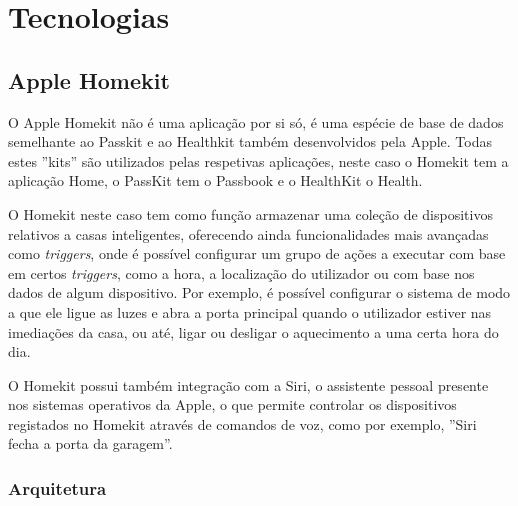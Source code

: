 \section{Tecnologias}

\subsection{Apple Homekit}

O Apple Homekit não é uma aplicação por si só, é uma espécie de base de dados semelhante ao Passkit e ao Healthkit também desenvolvidos pela Apple. Todas estes ''kits'' são utilizados pelas respetivas aplicações, neste caso o Homekit tem a aplicação Home, o PassKit tem o Passbook e o HealthKit o Health.

O Homekit neste caso tem como função armazenar uma coleção de dispositivos relativos a casas inteligentes, oferecendo ainda funcionalidades mais avançadas como \textit{triggers}, onde é possível configurar um grupo de ações a executar com base em certos \textit{triggers}, como a hora, a localização do utilizador ou com base nos dados de algum dispositivo. Por exemplo, é possível configurar o sistema de modo a que ele ligue as luzes e abra a porta principal quando o utilizador estiver nas imediações da casa, ou até, ligar ou desligar o aquecimento a uma certa hora do dia.

O Homekit possui também integração com a Siri, o assistente pessoal presente nos sistemas operativos da Apple, o que permite controlar os dispositivos registados no Homekit através de comandos de voz, como por exemplo, ''Siri fecha a porta da garagem''.

\subsubsection{Arquitetura}

